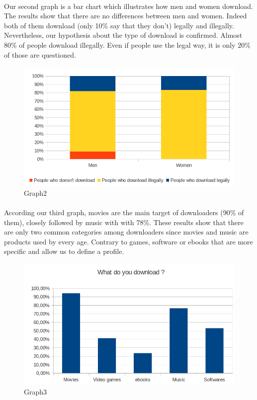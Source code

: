 \documentclass[a4paper]{article}
\begin{document}
\paragraph{}
Our second graph is a bar chart which illustrates how men and women download. The results show that there are no differences between men and women. Indeed both of them download (only 10\% say that they don't) legally and illegally. Nevertheless, our hypothesis about the type of download is confirmed. Almost 80\% of people download illegally. Even if people use the legal way, it is only 20\% of those are questioned.
\begin{figure}[htbp]
  \centering
  \includegraphics[scale=0.30]{graph2}
  \caption{Graph2}
  \label{fig:Graph2}
\end{figure}
\paragraph{}
According our third graph, movies are the main target of downloaders (90\% of them), closely followed by music with with 78\%. These results show that there are only two common categories among downloaders since movies and music are products used by every age. Contrary to games, software or ebooks that are more specific and allow us to define a profile. 
\begin{figure}[htbp]
  \centering
  \includegraphics[scale=0.40]{graph3}
  \caption{Graph3}
  \label{fig:Graph3}
\end{figure}
\end{document}
